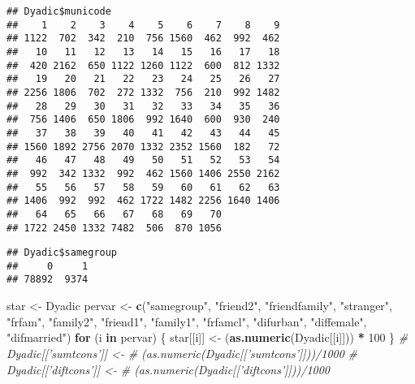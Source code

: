 \documentclass[]{tufte-handout}
\newenvironment{Shaded}{\begin{snugshade}}{\end{snugshade}}
\newcommand{\KeywordTok}[1]{\textcolor[rgb]{0.13,0.29,0.53}{\textbf{#1}}}
\newcommand{\DataTypeTok}[1]{\textcolor[rgb]{0.13,0.29,0.53}{#1}}
\newcommand{\DecValTok}[1]{\textcolor[rgb]{0.00,0.00,0.81}{#1}}
\newcommand{\StringTok}[1]{\textcolor[rgb]{0.31,0.60,0.02}{#1}}
\newcommand{\CommentTok}[1]{\textcolor[rgb]{0.56,0.35,0.01}{\textit{#1}}}
\newcommand{\ControlFlowTok}[1]{\textcolor[rgb]{0.13,0.29,0.53}{\textbf{#1}}}
\newcommand{\OperatorTok}[1]{\textcolor[rgb]{0.81,0.36,0.00}{\textbf{#1}}}
\newcommand{\NormalTok}[1]{#1}
\begin{document}
\begin{verbatim}
## Dyadic$municode
##    1    2    3    4    5    6    7    8    9 
## 1122  702  342  210  756 1560  462  992  462 
##   10   11   12   13   14   15   16   17   18 
##  420 2162  650 1122 1260 1122  600  812 1332 
##   19   20   21   22   23   24   25   26   27 
## 2256 1806  702  272 1332  756  210  992 1482 
##   28   29   30   31   32   33   34   35   36 
##  756 1406  650 1806  992 1640  600  930  240 
##   37   38   39   40   41   42   43   44   45 
## 1560 1892 2756 2070 1332 2352 1560  182   72 
##   46   47   48   49   50   51   52   53   54 
##  992  342 1332  992  462 1560 1406 2550 2162 
##   55   56   57   58   59   60   61   62   63 
## 1406  992  992  462 1722 1482 2256 1640 1406 
##   64   65   66   67   68   69   70 
## 1722 2450 1332 7482  506  870 1056
\end{verbatim}

\begin{Shaded}
\end{Shaded}

\begin{verbatim}
## Dyadic$samegroup
##     0     1 
## 78892  9374
\end{verbatim}

\begin{Shaded}
\end{Shaded}

\begin{Shaded}
\begin{Highlighting}[]
\NormalTok{star <-}\StringTok{ }\NormalTok{Dyadic}
\NormalTok{pervar <-}\StringTok{ }\KeywordTok{c}\NormalTok{(}\StringTok{"samegroup"}\NormalTok{, }\StringTok{"friend2"}\NormalTok{, }\StringTok{"friendfamily"}\NormalTok{, }
    \StringTok{"stranger"}\NormalTok{, }\StringTok{"frfam"}\NormalTok{, }\StringTok{"family2"}\NormalTok{, }\StringTok{"friend1"}\NormalTok{, }
    \StringTok{"family1"}\NormalTok{, }\StringTok{"frfamcl"}\NormalTok{, }\StringTok{"difurban"}\NormalTok{, }\StringTok{"diffemale"}\NormalTok{, }
    \StringTok{"difmarried"}\NormalTok{)}
\ControlFlowTok{for}\NormalTok{ (i }\ControlFlowTok{in}\NormalTok{ pervar) \{}
\NormalTok{    star[[i]] <-}\StringTok{ }\NormalTok{(}\KeywordTok{as.numeric}\NormalTok{(Dyadic[[i]])) }\OperatorTok{*}\StringTok{ }\DecValTok{100}
\NormalTok{\}}
\CommentTok{# Dyadic[['sumtcons']] <-}
\CommentTok{# (as.numeric(Dyadic[['sumtcons']]))/1000}
\CommentTok{# Dyadic[['diftcons']] <-}
\CommentTok{# (as.numeric(Dyadic[['diftcons']]))/1000}
\end{Highlighting}
\end{Shaded}
\end{document}

